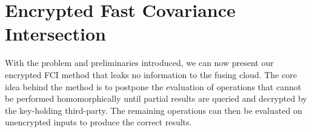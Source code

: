 \documentclass[letterpaper, 10 pt, conference]{ieeeconf}
\begin{document}
% 
%                                                                        
%                                                                        
%                                                                        
% 
\section{Encrypted Fast Covariance Intersection}\label{sec:encrypted_fci}
With the problem and preliminaries introduced, we can now present our encrypted FCI method that leaks no information to the fusing cloud. The core idea behind the method is to postpone the evaluation of operations that cannot be performed homomorphically until partial results are queried and decrypted by the key-holding third-party. The remaining operations can then be evaluated on unencrypted inputs to produce the correct results.
\end{document}
